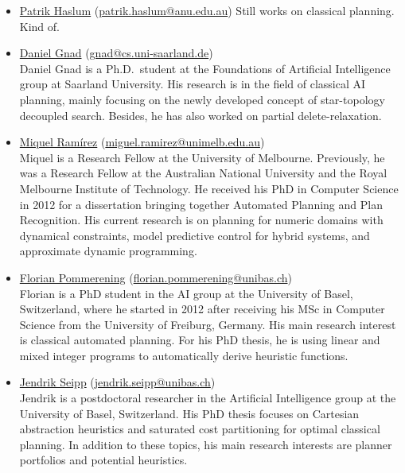 \documentclass[10pt]{article}
\begin{document}
\begin{itemize}

\item \href{https://users.cecs.anu.edu.au/~patrik/}{Patrik Haslum}
(\href{mailto:patrik.haslum@anu.edu.au}{patrik.haslum@anu.edu.au})
Still works on classical planning. Kind of.

\item \href{http://}{Daniel Gnad}
(\href{mailto:gnad@cs.uni-saarland.de}{gnad@cs.uni-saarland.de})\\
Daniel Gnad is a Ph.D.\ student at the Foundations of Artificial
Intelligence group at Saarland University. His research is in the field 
of classical AI planning, mainly focusing on the newly developed concept 
of star-topology decoupled search. Besides, he has also worked on partial
delete-relaxation.

\item \href{http://findanexpert.unimelb.edu.au/display/person778610#tab-overview}{Miquel Ram\'{i}rez}
(\href{mailto:miguel.ramirez@unimelb.edu.au}{miguel.ramirez@unimelb.edu.au})\\
Miquel is a Research Fellow at the University of Melbourne. Previously, he was
a Research Fellow at the Australian National University and the Royal Melbourne
Institute of Technology. He
received his PhD in Computer Science in 2012 for a dissertation
bringing together Automated Planning and Plan Recognition. His current
research is on planning for numeric domains with dynamical constraints, model predictive
control for hybrid systems, and approximate dynamic programming.

 \item \href{http://ai.cs.unibas.ch/people/pommeren}{Florian Pommerening}
   (\href{mailto:florian.pommerening@unibas.ch}{florian.pommerening@unibas.ch})\\
   Florian is a PhD student in the AI group at the University of Basel,
   Switzerland, where he started in 2012 after receiving his MSc in
   Computer Science from the University of Freiburg, Germany. His main
   research interest is classical automated planning. For his PhD
   thesis, he is using linear and mixed integer programs to
   automatically derive heuristic functions.

 \item \href{http://ai.cs.unibas.ch/people/seipp}{Jendrik Seipp}
   (\href{mailto:jendrik.seipp@unibas.ch}{jendrik.seipp@unibas.ch})\\
   Jendrik is a postdoctoral researcher in the Artificial Intelligence
   group at the University of Basel, Switzerland. His PhD thesis focuses
   on Cartesian abstraction heuristics and saturated cost partitioning
   for optimal classical planning. In addition to these topics, his main
   research interests are planner portfolios and potential heuristics.


\end{itemize}
\end{document}

